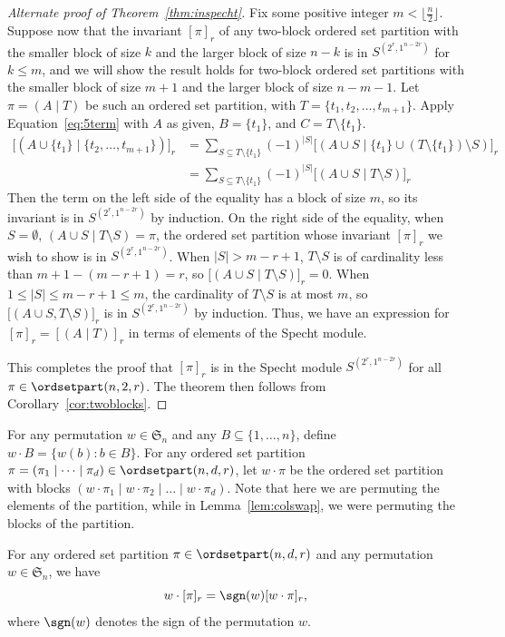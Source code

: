 \begin{proof}[Alternate proof of Theorem~\ref{thm:inspecht}]
Fix some positive integer $m< \lfloor\frac{n}{2}\rfloor$. Suppose now that the invariant $[\pi]_r$ of any two-block ordered set partition with the smaller block of size $k$ and the larger block of size $n-k$ is in $S^{(2^r,1^{n-2r})}$ for $k\leq m$, and we will show the result holds for two-block ordered set partitions with the smaller block of size $m+1$ and the larger block of size $n-m-1$. 
Let $\pi=(A \mid T)$ be such an ordered set partition, with $T=\{t_1,t_2,\ldots,t_{m+1}\}$.  
Apply Equation~\eqref{eq:5term} with $A$ as given, $B=\{t_1\}$, and $C=T\setminus \{t_1\}$.
\begin{align*}
\big[(A\cup \{t_1\} \mid \{t_2,\ldots,t_{m+1}\})\big]_r&=\sum_{S\subseteq T\setminus \{t_1\}}(-1)^{|S|}\big[(A\cup S \mid \{t_1\}\cup (T\setminus \{t_1\})\setminus S)\big]_r\\
&=\sum_{S\subseteq T\setminus \{t_1\}}(-1)^{|S|}\big[(A\cup S \mid T\setminus S ) \big]_r
\end{align*}
Then the term on the left side of the equality has a block of size $m$, so its invariant is in $S^{(2^r,1^{n-2r})}$ by induction. On the right side of the equality, when $S=\emptyset$, $(A\cup S\mid T\setminus S)=\pi$, the ordered set partition whose invariant $[\pi]_r$ we wish to show is in $S^{(2^r,1^{n-2r})}$. When $|S|>m-r+1$, $T\setminus S$ is of cardinality less than $m+1-(m-r+1)=r$, so $\big[(A\cup S\mid T\setminus S)\big]_r=0$. When $1\leq |S|\leq m-r+1\leq m$, the cardinality of $T\setminus S$ is at most $m$, so $\big[(A\cup S,T\setminus S)\big]_r$ is in $S^{(2^r,1^{n-2r})}$ by induction. Thus, we have an expression for $[\pi]_r=[(A\mid T)]_r$ in terms of elements of the Specht module. 

This completes the proof that $[\pi]_r$ is in the Specht module $S^{(2^r,1^{n-2 r})}$ for all $\pi\in\ordsetpart(n,2,r)$. The theorem then follows from Corollary~\ref{cor:twoblocks}.
\end{proof}

For any permutation $w \in \mathfrak{S}_n$ and any $B \subseteq \{1, \dots, n\}$, define $w \cdot B = \{ w(b) : b \in B \}$.
For any ordered set partition $\pi = (\pi_1\mid  \dots\mid \pi_d ) \in \ordsetpart(n,d,r)$, let $w \cdot \pi$ be the ordered set partition with blocks $( w \cdot \pi_1\mid w \cdot \pi_2\mid \dots\mid w \cdot \pi_d )$. Note that here we are permuting the elements of the partition, while in Lemma~\ref{lem:colswap}, we were permuting the blocks of the partition.


\begin{proposition}
\label{prop:any_perm}
For any ordered set partition $\pi \in \ordsetpart(n,d,r)$ and any permutation $w \in \mathfrak{S}_n$, we have 
\[
w \cdot [\pi]_r = \sgn(w) [w \cdot \pi]_r,
\]
where $\sgn(w)$ denotes the sign of the permutation $w$.
\end{proposition}


